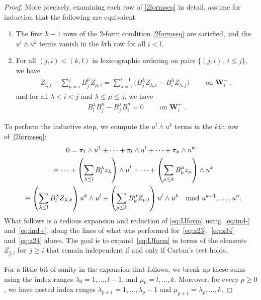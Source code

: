 \documentclass[11pt]{article}
\numberwithin{equation}{section}
\DeclareMathOperator{\Wu}{\mathbf{W}}
\begin{document}
\begin{proof}
More precisely, examining each row of \eqref{2formseq} in detail, assume for induction that the following are equivalent
\begin{enumerate}\itemsep=0pt
\item The f\/irst $k-1$ rows of the 2-form condition
\eqref{2formseq} are satisf\/ied, and the $u^i \wedge u^k$ terms vanish in the
$k$th row for all $i < l$.
\item For all $(j,i)  < (k,l)$ in lexicographic ordering on
pairs $\{ (j,i),\; i \leq j\}$, we have
\begin{gather}
   Z_{i,j} - \sum_{\mu=i}^jB^{\mu}_{j} \underline{Z_{\mu,i}} = \sum_{\lambda=1}^{i-1} \big( B^{\lambda}_{j}
   Z_{\lambda,i} - B^{\lambda}_{i} Z_{\lambda,j}\big) \qquad \text{on $\Wu^-_i$},
   \label{eq:ind-}
\end{gather}
and for all $\lambda <i < j$ and $\lambda \leq \mu \leq j$, we have
\begin{gather}
B^\lambda_i B^\mu_j - B^\lambda_j B^\mu_i=0 \qquad \text{on $\Wu^+_i$}.
\label{eq:ind+}
\end{gather}
\end{enumerate}


To perform the inductive step, we compute the $u^l \wedge u^k$ terms in the $k$th row of~\eqref{2formseq}:
\begin{gather}
0  =  \pi_1 \wedge u^1 + \cdots + \pi_l \wedge u^l +\cdots+ \pi_k \wedge u^k \nonumber\\
 \hphantom{0}{}  = \cdots + \left( \sum_{\lambda \leq l} B^{\lambda}_l z_{\lambda}
  \right) \wedge u^l + \cdots +  \left( \sum_{\mu\leq k} B^\mu_k z_\mu\right) \wedge u^k \nonumber\\
 \hphantom{0}{}
 \equiv  \left( \sum_{\lambda \leq l} B^{\lambda}_l Z_{\lambda,k}
  \right) u^k \wedge u^l  +  \left( \sum_{\mu\leq k} B^\mu_k
  Z_{\mu,l}\right) u^l \wedge u^k \
  \mod u^{k+1}, \ldots, u^n.
\label{eq:IJform}
\end{gather}
What follows is a tedious expansion and reduction of \eqref{eq:IJform} using~\eqref{eq:ind-} and~\eqref{eq:ind+}, along
the lines of what was performed for~\eqref{eq:z23},~\eqref{eq:z34} and~\eqref{eq:z24} above.  The goal is to expand~\eqref{eq:IJform} in terms of
the elements~$\underline{Z_{j,i}}$ for~$j \geq i$ that remain independent if
and only if Cartan's test holds.

For a little bit of sanity in the expansion that follows, we break up these
sums using the index ranges $\lambda_0 = 1, \ldots, l-1$, and $\mu_0 = l,
\ldots, k$.  Moreover, for every $p\geq 0$, we have nested index ranges $\lambda_{p+1}
= 1, \ldots, \lambda_{p}-1$ and $\mu_{p+1} = \lambda_p, \ldots, k$.


\end{proof}
\end{document}
